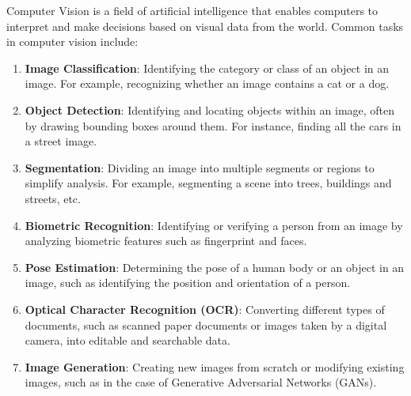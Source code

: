 Computer Vision is a field of artificial intelligence that enables computers to interpret and make decisions based on visual data from the world. Common tasks in computer vision include:

\begin{enumerate}
    \item \textbf{Image Classification}: Identifying the category or class of an object in an image. For example, recognizing whether an image contains a cat or a dog.
    \item \textbf{Object Detection}: Identifying and locating objects within an image, often by drawing bounding boxes around them. For instance, finding all the cars in a street image.
    \item \textbf{Segmentation}: Dividing an image into multiple segments or regions to simplify analysis. For example, segmenting a scene into trees, buildings and streets, etc. 
    \item \textbf{Biometric Recognition}: Identifying or verifying a person from an image by analyzing biometric features such as fingerprint and faces.
    \item \textbf{Pose Estimation}: Determining the pose of a human body or an object in an image, such as identifying the position and orientation of a person.
    \item \textbf{Optical Character Recognition (OCR)}: Converting different types of documents, such as scanned paper documents or images taken by a digital camera, into editable and searchable data.
    \item \textbf{Image Generation}: Creating new images from scratch or modifying existing images, such as in the case of Generative Adversarial Networks (GANs).
\end{enumerate}


